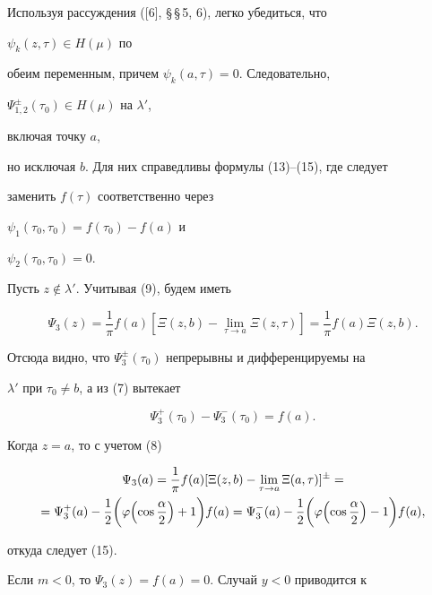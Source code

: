  


Используя рассуждения ([6], \S\,\S\,5, 6), легко убедиться, что 


$\psi_k(z,\tau)\in H(\mu)$ по 


обеим переменным, причем $\psi_k(a,\tau)=0$. Следовательно, 


$\Psi^\pm_{1,2}(\tau_0)\in H(\mu)$ на $\lambda'$, 


включая точку $a$, 


но исключая $b$. Для них справедливы формулы (13)--(15), где следует 


заменить $f(\tau)$ соответственно через 


$\psi_1(\tau_0,\tau_0)=f(\tau_0)-f(a)$ и 


$\psi_2(\tau_0,\tau_0)=0$. 


 


Пусть $z\notin \lambda'$. Учитывая (9), будем иметь 


$$ 


\Psi_3(z)=\frac{1}{\pi}f(a)[\Xi(z,b)- 


\lim_{\tau\to a}\Xi(z,\tau)]=\frac{1}{\pi}f(a)\Xi(z,b). 


$$ 


Отсюда видно, что $\Psi^\pm_3(\tau_0)$ непрерывны и дифференцируемы на 


$\lambda'$ при $\tau_0\ne b$, а из (7) вытекает


$$ 


\Psi^+_3(\tau_0)-\Psi^-_3(\tau_0)=f(a).


$$ 


Когда $z=a$, то с учетом (8) 


\begin{multline*} 


\Psi_3(a)=\frac{1}{\pi}f(a)[\Xi(z,b)-\lim_{\tau\to a} 


\Xi(a,\tau)]^\pm= \\ 


=\Psi^+_3(a)-\frac{1}{2}\biggl(\varphi\Bigl(\cos\frac{\alpha}{2} 


\Bigr)+1\biggr)f(a)=\Psi^-_3(a)-\frac{1}{2} 


\biggl(\varphi\Bigl(\cos\frac{\alpha}{2}\Bigr)-1\biggr)f(a), 


\end{multline*} 


откуда следует (15). 


 


Если $m<0$, то $\Psi_3(z)=f(a)=0$. Случай $y<0$ приводится к  


